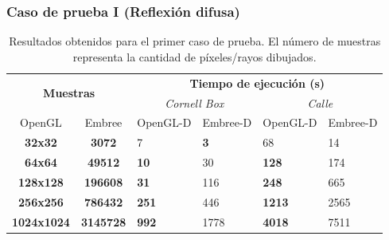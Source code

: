 \subsubsection{Caso de prueba I (Reflexión difusa)}

\begin{table}[htbp]
	\centering
	\begin{tabular}{|c|c|l|l||l|l|}
		\hline
		\multicolumn{2}{|c|}{\multirow{2}{*}{\textbf{Muestras}}} & \multicolumn{4}{c|}{\textbf{Tiempo de ejecución (s)}}                                                                                  \\ \cline{3-6} 
		\multicolumn{2}{|c|}{}                   & \multicolumn{2}{c||}{\textit{Cornell Box}}                 & \multicolumn{2}{c|}{\textit{Calle}}                      \\ \cline{1-6}
		\multicolumn{1}{|c|}{OpenGL} &\multicolumn{1}{c|}{Embree} &
		\multicolumn{1}{c|}{OpenGL-D} & \multicolumn{1}{c||}{Embree-D} & \multicolumn{1}{c|}{OpenGL-D} & \multicolumn{1}{c|}{Embree-D} \\ \hline
		\textbf{32x32}                        &
		\textbf{3072}                        & 7                           & \textbf{3}                           & 68                          & 14                          \\ \hline
		\textbf{64x64}                        &
		\textbf{49512}                       & \textbf{10}                          & 30                          & \textbf{128}                         & 174                         \\ \hline
		\textbf{128x128}                        &
		\textbf{196608}                       & \textbf{31}                          & 116                         & \textbf{248}                         & 665                         \\ \hline
		\textbf{256x256}                        &
		\textbf{786432}   & \textbf{251}                         & 446                         & \textbf{1213}                        & 2565                        \\ \hline
		\textbf{1024x1024}                        &
		\textbf{3145728}                      & \textbf{992}                         & 1778                        & \textbf{4018}                        & 7511                        \\ \hline
	\end{tabular}
	\caption{Resultados obtenidos para el primer caso de prueba. El número de muestras representa la cantidad de píxeles/rayos dibujados.}
	\label{tab:tablecaso1}
\end{table}

